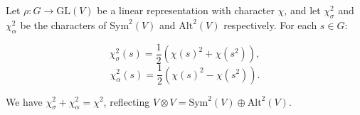 Let $\rho: G \to \text{GL}(V)$ be a linear representation with character $\chi$, and let $\chi_\sigma^2$ and $\chi_\alpha^2$ be the characters of $\text{Sym}^2(V)$ and $\text{Alt}^2(V)$ respectively. For each $s \in G$:

$$\chi_\sigma^2(s) = \frac{1}{2}(\chi(s)^2 + \chi(s^2)),$$
$$\chi_\alpha^2(s) = \frac{1}{2}(\chi(s)^2 - \chi(s^2)).$$

We have $\chi_\sigma^2 + \chi_\alpha^2 = \chi^2$, reflecting $V \otimes V = \text{Sym}^2(V) \oplus \text{Alt}^2(V)$.
